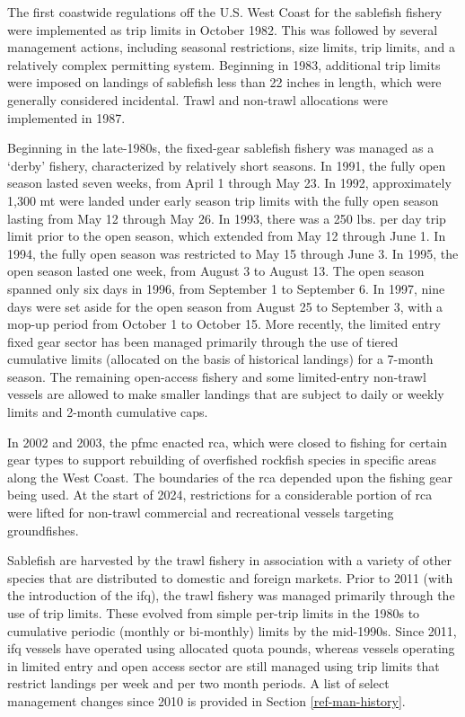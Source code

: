 \documentclass[
  english,
]{article}
\begin{document}
The first coastwide regulations off the U.S. West Coast for the
sablefish fishery were implemented as trip limits in October 1982. This
was followed by several management actions, including seasonal
restrictions, size limits, trip limits, and a relatively complex
permitting system. Beginning in 1983, additional trip limits were
imposed on landings of sablefish less than 22 inches in length, which
were generally considered incidental. Trawl and non-trawl allocations
were implemented in 1987.

Beginning in the late-1980s, the fixed-gear sablefish fishery was
managed as a `derby' fishery, characterized by relatively short seasons.
In 1991, the fully open season lasted seven weeks, from April 1 through
May 23. In 1992, approximately 1,300 mt were landed under early season
trip limits with the fully open season lasting from May 12 through May
26. In 1993, there was a 250 lbs. per day trip limit prior to the open
season, which extended from May 12 through June 1. In 1994, the fully
open season was restricted to May 15 through June 3. In 1995, the open
season lasted one week, from August 3 to August 13. The open season
spanned only six days in 1996, from September 1 to September 6. In 1997,
nine days were set aside for the open season from August 25 to September
3, with a mop-up period from October 1 to October 15. More recently, the
limited entry fixed gear sector has been managed primarily through the
use of tiered cumulative limits (allocated on the basis of historical
landings) for a 7-month season. The remaining open-access fishery and
some limited-entry non-trawl vessels are allowed to make smaller
landings that are subject to daily or weekly limits and 2-month
cumulative caps.

In 2002 and 2003, the \gls{pfmc} enacted \gls{rca}, which were closed to
fishing for certain gear types to support rebuilding of overfished
rockfish species in specific areas along the West Coast. The boundaries
of the \gls{rca} depended upon the fishing gear being used. At the start
of 2024, restrictions for a considerable portion of \gls{rca} were
lifted for non-trawl commercial and recreational vessels targeting
groundfishes.

Sablefish are harvested by the trawl fishery in association with a
variety of other species that are distributed to domestic and foreign
markets. Prior to 2011 (with the introduction of the \gls{ifq}), the
trawl fishery was managed primarily through the use of trip limits.
These evolved from simple per-trip limits in the 1980s to cumulative
periodic (monthly or bi-monthly) limits by the mid-1990s. Since 2011,
\gls{ifq} vessels have operated using allocated quota pounds, whereas
vessels operating in limited entry and open access sector are still
managed using trip limits that restrict landings per week and per two
month periods. A list of select management changes since 2010 is
provided in Section \ref{ref-man-history}.
\end{document}
